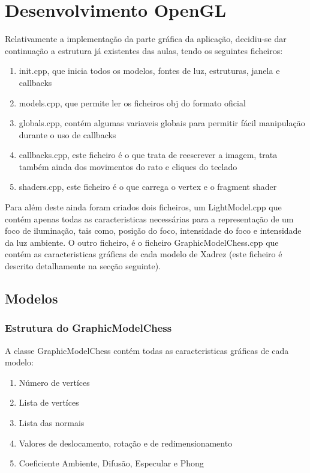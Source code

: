 \documentclass[11pt,a4paper]{report}
\begin{document}
\section{Desenvolvimento OpenGL}

Relativamente a implementação da parte gráfica da aplicação, decidiu-se dar continuação a estrutura já existentes das aulas, tendo os seguintes ficheiros:
\begin{enumerate}
\item{init.cpp, que inicia todos os modelos, fontes de luz, estruturas, janela e callbacks}
\item{models.cpp, que permite ler os ficheiros obj do formato oficial}
\item{globals.cpp, contém algumas variaveis globais para permitir fácil manipulação durante o uso de callbacks}
\item{callbacks.cpp, este ficheiro é o que trata de reescrever a imagem, trata também ainda dos movimentos do rato e cliques do teclado}
\item{shaders.cpp, este ficheiro é o que carrega o vertex e o fragment shader}
\end{enumerate}

Para além deste ainda foram criados dois ficheiros, um LightModel.cpp que contém apenas todas as caracteristicas necessárias para a representação de um foco de iluminação, tais como, posição do foco, intensidade do foco e intensidade da luz ambiente.
O outro ficheiro, é o ficheiro GraphicModelChess.cpp que contém as caracteristicas gráficas de cada modelo de Xadrez (este ficheiro é descrito detalhamente na secção seguinte).

\subsection{Modelos}

\subsubsection{Estrutura do GraphicModelChess}

A classe GraphicModelChess contém todas as caracteristicas gráficas de cada modelo:
\begin{enumerate}
\item{Número de vertíces}
\item{Lista de vertíces}
\item{Lista das normais}
\item{Valores de deslocamento, rotação e de redimensionamento}
\item{Coeficiente Ambiente, Difusão, Especular e Phong}
\end{enumerate}
\end{document}
